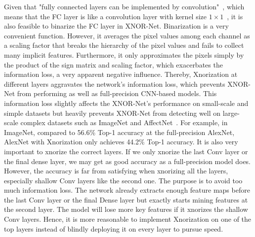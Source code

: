\documentclass[sn-mathphys,iicol,Numbered]{sn-jnl}
\begin{document}
Given that "fully connected layers can be implemented by convolution"~\citep{A2_xnor}, which means that the FC layer is like a convolution layer with kernel size $1\times 1$~\citep{A2_xnor}, it is also feasible to binarize the FC layer in XNOR-Net. Binarization is a very convenient function. However, it averages the pixel values among each channel as a scaling factor that breaks the hierarchy of the pixel values and fails to collect many implicit features. Furthermore, it only approximates the pixels simply by the product of the sign matrix and scaling factor, which exacerbates the information loss, a very apparent negative influence. Thereby, Xnorization at different layers aggravates the network's information loss, which prevents XNOR-Net from performing as well as full-precision CNN-based models. This information loss slightly affects the XNOR-Net's performance on small-scale and simple datasets but heavily prevents XNOR-Net from detecting well on large-scale complex datasets such as ImageNet and AffectNet~\citep{A52_affnet}. For example, in ImageNet, compared to 56.6\% Top-1 accuracy at the full-precision AlexNet, AlexNet with Xnorization only achieves 44.2\% Top-1 accuracy. It is also very important to xnorize the correct layers. If we only xnorize the last Conv layer or the final dense layer, we may get as good accuracy as a full-precision model does. However, the accuracy is far from satisfying when xnorizing all the layers, especially shallow Conv layers like the second one. The purpose is to avoid too much information loss. The network already extracts enough feature maps before the last Conv layer or the final Dense layer but exactly starts mining features at the second layer. The model will lose more key features if it xnorizes the shallow Conv layers. Hence, it is more reasonable to implement Xnorization on one of the top layers instead of blindly deploying it on every layer to pursue speed.
\end{document}
